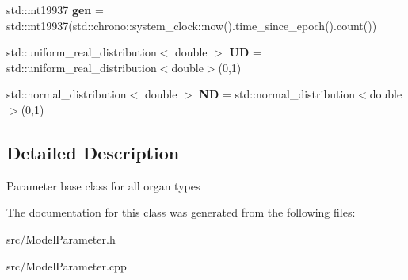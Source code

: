\begin{DoxyCompactItemize}
std\+::mt19937 {\bfseries gen} = std\+::mt19937(std\+::chrono\+::system\+\_\+clock\+::now().time\+\_\+since\+\_\+epoch().count())
\item 
\mbox{\label{classCPlantBox_1_1OrganRandomOrganParameter_a09e276880d6c31226e49ad7aa70b432f}} 
std\+::uniform\+\_\+real\+\_\+distribution$<$ double $>$ {\bfseries UD} = std\+::uniform\+\_\+real\+\_\+distribution$<$double$>$(0,1)
\item 
\mbox{\label{classCPlantBox_1_1OrganRandomOrganParameter_a2d2bf40fb63f3632d66754cc8a1a1cba}} 
std\+::normal\+\_\+distribution$<$ double $>$ {\bfseries ND} = std\+::normal\+\_\+distribution$<$double$>$(0,1)
\end{DoxyCompactItemize}


\subsection{Detailed Description}
Parameter base class for all organ types 

The documentation for this class was generated from the following files\+:\begin{DoxyCompactItemize}
\item 
src/Model\+Parameter.\+h\item 
src/Model\+Parameter.\+cpp\end{DoxyCompactItemize}
